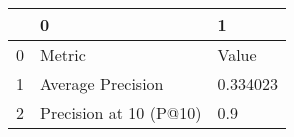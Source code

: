 \begin{tabular}{lll}
\toprule
{} &                       0 &         1 \\
\midrule
0 &                  Metric &     Value \\
1 &       Average Precision &  0.334023 \\
2 &  Precision at 10 (P@10) &       0.9 \\
\bottomrule
\end{tabular}
